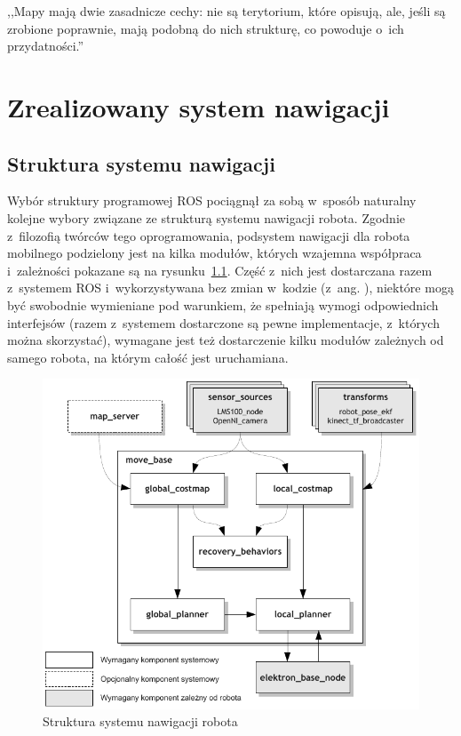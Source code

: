 

\begin{savequote}[70mm]
,,Mapy mają dwie zasadnicze cechy: nie są terytorium, które opisują, ale, jeśli
są zrobione poprawnie, mają podobną do nich strukturę, co powoduje o~ich
przydatności.''
\end{savequote}


\chapter{Zrealizowany system nawigacji}
\label{chap:mapa}

\section{Struktura systemu nawigacji}

Wybór struktury programowej ROS pociągnął za sobą w~sposób naturalny kolejne
wybory związane ze strukturą systemu nawigacji robota. Zgodnie z~filozofią
twórców tego oprogramowania, podsystem nawigacji dla robota mobilnego podzielony
jest na kilka modułów, których wzajemna współpraca i~zależności pokazane są na
rysunku~\ref{fig:diag_move_base}. Część z~nich jest dostarczana razem z~systemem
ROS i~wykorzystywana bez zmian w~kodzie (z~ang. ), niektóre mogą być
swobodnie wymieniane pod warunkiem, że spełniają wymogi odpowiednich interfejsów
(razem z~systemem dostarczone są pewne implementacje, z~których można
skorzystać), wymagane jest też dostarczenie kilku modułów zależnych od samego
robota, na którym całość jest uruchamiana.

\begin{figure}[h!]
\centering
\includegraphics{../img/diag_move_base}
\caption{Struktura systemu nawigacji robota}
\label{fig:diag_move_base}
\end{figure}

